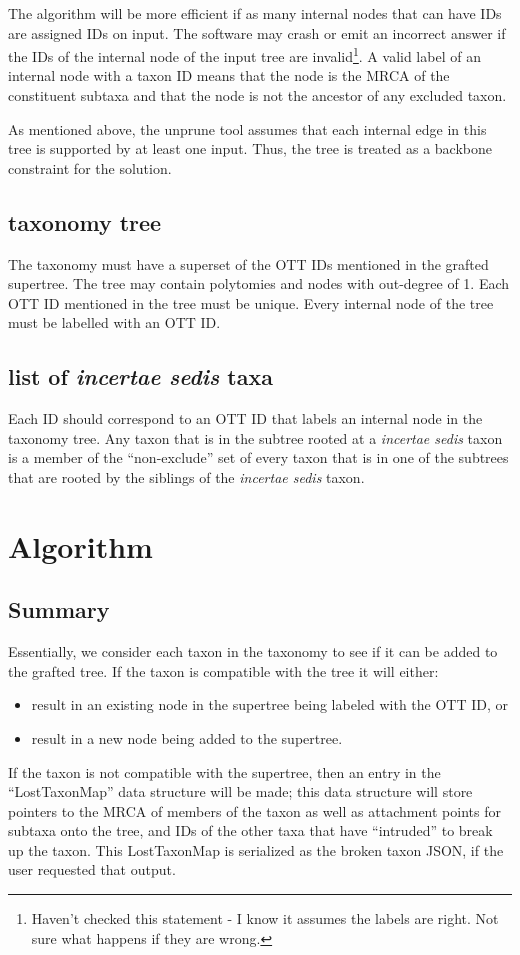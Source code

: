 \documentclass[english]{article}
\newcommand{\incsed}[0]{{\em incertae sedis}\xspace}
\begin{document}
The algorithm will be more efficient if as many internal nodes that can have IDs are 
    assigned IDs on input.
The software may crash or emit an incorrect answer if the IDs of the internal node
    of the input tree are invalid\footnote{Haven't checked this statement - I know it assumes the labels are right. Not sure what happens if they are wrong.}. 
A valid label of an internal node with a taxon ID means that the node is the MRCA
    of the constituent subtaxa and that the node is not the ancestor of any
    excluded taxon.

As mentioned above, the unprune tool assumes that each internal edge in this tree
    is supported by at least one input.
Thus, the tree is treated as a backbone constraint for the solution.

\subsection{taxonomy tree}
The taxonomy must have a superset of the OTT IDs mentioned in the grafted supertree.
The tree may contain polytomies and nodes with out-degree of 1.
Each OTT ID mentioned in the tree must be unique.
Every internal node of the tree must be labelled with an OTT ID.

\subsection{list of \incsed taxa}
Each ID should correspond to an OTT ID that labels an internal node in the taxonomy tree.
Any taxon that is in the subtree rooted at a \incsed taxon is
    a member of the ``non-exclude'' set of every taxon that is in one
    of the subtrees that are rooted by the siblings of the \incsed taxon.

\section{Algorithm}
\subsection{Summary}
Essentially, we consider each taxon in the taxonomy to see if it can be added to the grafted tree.
If the taxon is compatible with the tree it will either:
\begin{itemize}
    \item result in an existing node in the supertree being labeled with the OTT ID, or
    \item result in a new node being added to the supertree.
\end{itemize}
If the taxon is not compatible with the supertree, then an entry in the ``LostTaxonMap'' data
    structure will be made; this data structure will store pointers to the
    MRCA of members of the taxon as well as attachment points for subtaxa onto the tree, and
    IDs of the other taxa that have ``intruded'' to break up the taxon.
This LostTaxonMap is serialized as the broken taxon JSON, if the user requested that output.
\end{document}
